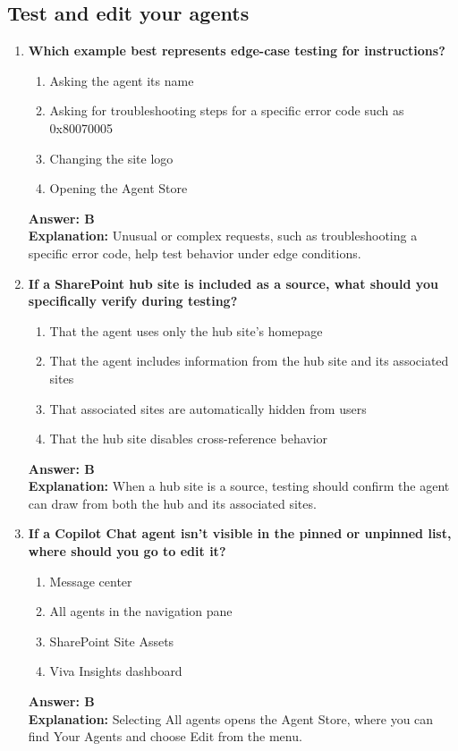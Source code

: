\documentclass[10pt]{article}
\begin{document}
\subsection{Test and edit your agents}
\begin{enumerate}[leftmargin=*]


\item \textbf{Which example best represents edge-case testing for instructions?}
\begin{enumerate}[label=\Alph*.]
  \item Asking the agent its name
  \item Asking for troubleshooting steps for a specific error code such as 0x80070005
  \item Changing the site logo
  \item Opening the Agent Store
\end{enumerate}
\textbf{Answer: B}\\
\textbf{Explanation:} Unusual or complex requests, such as troubleshooting a specific error code, help test behavior under edge conditions.


\item \textbf{If a SharePoint hub site is included as a source, what should you specifically verify during testing?}
\begin{enumerate}[label=\Alph*.]
  \item That the agent uses only the hub site's homepage
  \item That the agent includes information from the hub site and its associated sites
  \item That associated sites are automatically hidden from users
  \item That the hub site disables cross-reference behavior
\end{enumerate}
\textbf{Answer: B}\\
\textbf{Explanation:} When a hub site is a source, testing should confirm the agent can draw from both the hub and its associated sites.


\item \textbf{If a Copilot Chat agent isn't visible in the pinned or unpinned list, where should you go to edit it?}
\begin{enumerate}[label=\Alph*.]
  \item Message center
  \item All agents in the navigation pane
  \item SharePoint Site Assets
  \item Viva Insights dashboard
\end{enumerate}
\textbf{Answer: B}\\
\textbf{Explanation:} Selecting All agents opens the Agent Store, where you can find Your Agents and choose Edit from the menu.


\end{enumerate}
\end{document}
